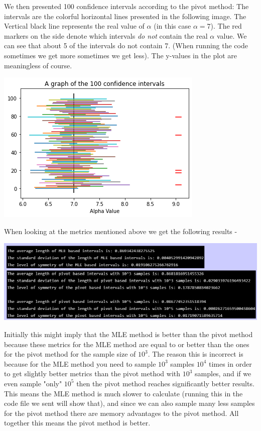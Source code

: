 \documentclass[../main.tex]{subfiles}
\begin{document}
\begin{enumerate}
We then presented 100 confidence intervals according to the pivot method: The intervals are the colorful horizontal lines presented in the following image. The Vertical black line represents the real value of $\alpha$ (in this case $\alpha=7$). The red markers on the side denote which intervals \emph{do not} contain the real $\alpha$ value. We can see that about 5 of the intervals do not contain 7. (When running the code sometimes we get more sometimes we get less). The y-values in the plot are meaningless of course. 
\begin{mdframed}[backgroundcolor=blue!20] 
    \begin{center}
        \includegraphics[scale=0.75]{images/10signintrvls.png}
    \end{center}
\end{mdframed}
When looking at the metrics mentioned above we get the following results - 
\begin{mdframed}[backgroundcolor=blue!20] 
    \begin{center}
        \includegraphics[scale=0.65]{images/Metrics For Different Methods.png}
    \end{center}
\end{mdframed}
Initially this might imply that the MLE method is better than the pivot method because these metrics for the MLE method are equal to or better than the ones for the pivot method for the sample size of $10^3$. The reason this is incorrect is because for the MLE method you need to sample $10^3$ samples $10^4$ times in order to get slightly better metrics than the pivot method with $10^3$ samples, and if we even sample "only" $10^5$ then the pivot method reaches significantly better results. This means the MLE method is much slower to calculate (running this in the code file we sent will show that), and since we can also sample many less samples for the pivot method there are memory advantages to the pivot method. All together this means the pivot method is better. 


\end{enumerate}
\end{document}
